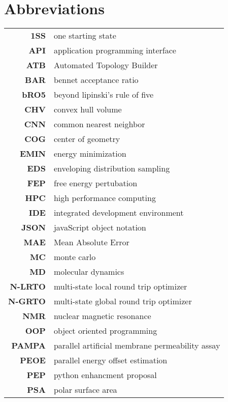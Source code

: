 \chapter{Abbreviations}
\begin{center}
\begin{longtable}{ >{\bfseries}r l}

 1SS & one starting state \\
 API & application programming interface\\
 ATB & Automated Topology Builder \\


 BAR & bennet acceptance ratio \\
 bRO5  & beyond lipinski's rule of five \\

 CHV & convex hull volume\\
 CNN & common nearest neighbor\\
 COG & center of geometry\\
 
 EMIN & energy minimization\\
 EDS & enveloping distribution sampling \\
 FEP & free energy pertubation \\

 HPC & high performance computing \\
 IDE & integrated development environment\\

 JSON & javaScript object notation\\

 MAE & Mean Absolute Error\\
 MC  & monte carlo \\
 MD  & molecular dynamics\\ 
 N-LRTO & multi-state local round trip optimizer \\
 N-GRTO & multi-state global round trip optimizer \\
 NMR & nuclear magnetic resonance\\
 
 OOP & object oriented programming\\

 PAMPA & parallel artificial membrane permeability assay\\
 PEOE & parallel energy offset estimation\\
 PEP & python enhancment proposal\\
 PSA & polar surface area\\


\end{longtable}
\end{center}
